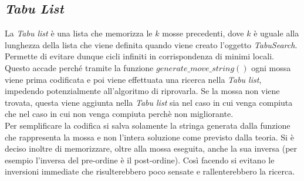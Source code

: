 \subsection{\textit{Tabu List}}
\label{sec:tabu-list}
\noindent La \textit{Tabu list} è una lista che memorizza le $k$ mosse precedenti, dove $k$ è uguale
alla lunghezza della lista che viene definita quando viene creato l'oggetto \textit{TabuSearch}.\\
Permette di evitare dunque cicli infiniti in corrispondenza
di minimi locali. Questo accade perché tramite la funzione
$generate\_move\_string()$ ogni mossa
viene prima codificata e poi viene effettuata una ricerca nella \textit{Tabu list}, impedendo potenzialmente all’algoritmo di riprovarla.
Se la mossa non viene trovata, questa viene aggiunta nella \textit{Tabu list} sia nel caso in cui venga compiuta che nel caso in cui non
venga compiuta perchè non migliorante.\\
Per semplificare la codifica si salva solamente la stringa generata dalla funzione che rappresenta la mossa e non l’intera
soluzione come previsto dalla teoria.
Si è deciso inoltre di memorizzare, oltre alla mossa eseguita, anche la sua inversa
(per esempio l'inversa del pre-ordine è il post-ordine). Così facendo si
evitano le inversioni immediate che risulterebbero poco sensate e rallenterebbero la ricerca.

